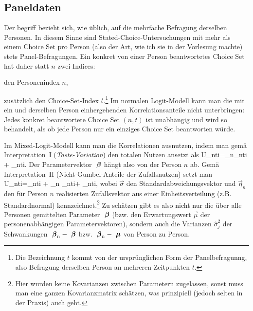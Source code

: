 \ei



\subsection{Paneldaten}

Der begriff  bezieht sich, wie \"ublich, auf die mehrfache Befragung
derselben Personen. In diesem Sinne sind Stated-Choice-Untersuchungen
mit mehr als einem Choice Set pro Person
(also der Art, wie ich sie in der Vorlesung machte) stets Panel-Befragungen. Ein konkret
von einer Person beantwortetes Choice Set hat daher statt $n$ zwei Indices:
\bi
\item den Personenindex $n$,
\item zus\"atzlich den Choice-Set-Index $t$.\footnote{Die Bezeichnung $t$ kommt von der
  urspr\"unglichen Form der Panelbefragunng, also Befragung derselben
  Person an mehreren Zeitpunkten $t$.}
\ei
Im normalen Logit-Modell kann man die mit ein
und derselben Person einhergehenden Korrelationsanteile nicht
unterbringen: Jedes konkret beantwortete Choice Set $(n,t)$ ist
unabh\"angig und wird so behandelt, als ob jede Person nur ein
einziges  Choice Set  beantworten w\"urde.

Im Mixed-Logit-Modell kann man die Korrelationen ausnutzen, indem man
gem\"a\3 
Interpretation~I (\emph{Taste-Variation}) den totalen Nutzen ansetzt als
\be
U_{nti}=\vecbeta_n\tr {}_{nti} + \epsilon_{nti}.
\ee
Der Parametervektor ${\mbox{ \boldmath {$\beta$}}}$ h\"angt also von der Person $n$ ab.
Gem\"a\3 Interpretation~II (Nicht-Gumbel-Anteile der Zufallsnutzen)
setzt man 
\be
\label{transScale}
U_{nti}=\vecbeta\tr {}_{nti} + \vec{\sigma}\tr \vec{\eta}_n
_{nti}+ \epsilon_{nti},
\ee
wobei $\vec{\sigma}$ den Standardabweichungsvektor und
 $\vec{\eta}_n$ den f\"ur Person $n$ 
realisierten Zufallsvektor aus einer Einheitsverteilung 
(z.B. Standardnormal) kennzeichnet.\footnote{Hier wurden keine Kovarianzen zwischen
  Parametern zugelassen, sonst 
muss man eine ganzen Kovarianzmatrix sch\"atzen, was prinzipiell
(jedoch selten in der Praxis) auch geht.} Zu sch\"atzen gibt es also
nicht nur die \"uber alle Personen gemittelten Parameter ${\mbox{ \boldmath {$\beta$}}}$
(bzw. den Erwartungswert $\vec{\mu}$ der personenabh\"angigen
Parametervektoren), sondern auch die Varianzen $\hat{\sigma}_j^2$ der
Schwankungen ${\mbox{ \boldmath {$\beta$}}}_n-{\mbox{ \boldmath {$\beta$}}}$ bzw. ${\mbox{ \boldmath {$\beta$}}}_n-{\mbox{ \boldmath {$\mu$}}}$ von Person zu
Person.


